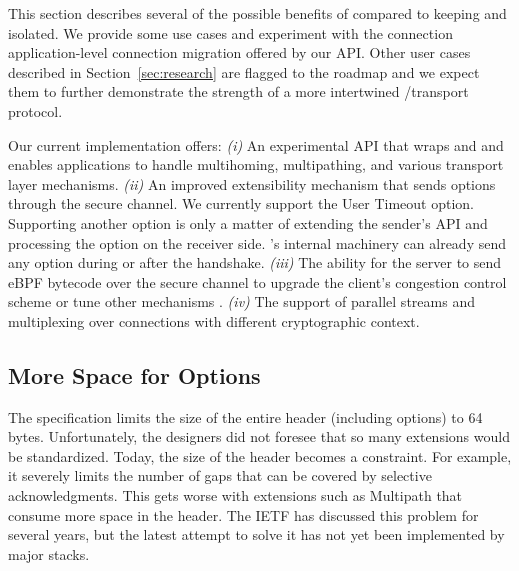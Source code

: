 \label{sec:content}

This section describes several of the possible benefits of \tcpls
compared to keeping \tcp and \tls isolated.
We provide some use cases and experiment with the
connection application-level connection migration offered by our API. Other user
cases described in Section~\ref{sec:research} are flagged to the roadmap and we
expect them to further demonstrate the
strength of a more intertwined \tls/\tcp transport protocol.

Our current implementation offers: 
\textit{(i)} An experimental API that wraps \tls and \tcp and enables
    applications to 
    handle multihoming, multipathing, and various transport layer mechanisms.
  \textit{(ii)} An improved \tcp extensibility mechanism that sends \tcp options
    through the secure \tcpls channel. We currently support the \tcp
    User Timeout option. Supporting another \tcp option is only a matter of
    extending the sender's API and processing the option
    on the receiver side. \tcpls's internal machinery can already send any \tcp
    option during or after the handshake.
\textit{(iii)} The ability for the server to send eBPF bytecode over the secure
  channel to upgrade the client's \tcp congestion control scheme or
  tune other \tcp mechanisms \cite{brakmo2017tcp, tran2019beyond}.
  \textit{(iv)} The support of parallel streams and multiplexing over \tcp connections
    with different cryptographic context.


\subsection{More Space for \tcp Options}
\label{sec:tcpoptions}

The \tcp specification limits the size of the entire \tcp header (including options)
to 64 bytes. Unfortunately, the \tcp designers did not foresee that so many \tcp
extensions would be standardized. Today, the size of the \tcp header
becomes a constraint. For example, it severely limits the number of gaps that
can be covered by selective acknowledgments. This gets worse with extensions
such as Multipath \tcp \cite{rfc6824} that consume more space in the \tcp header.
The IETF has discussed this problem for several years, but the latest attempt
to solve it \cite{draft-ietf-tcpm-tcp-edo-10} has not yet been implemented by
major \tcp stacks.

